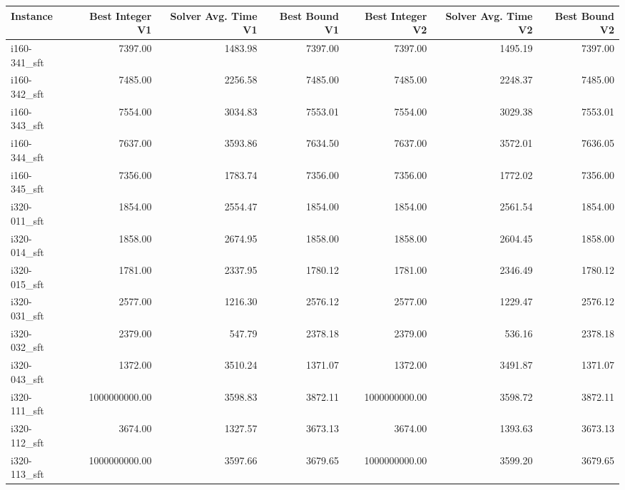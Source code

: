 \begin{tabular}{lrrrrrr}
\toprule
Instance &  Best Integer V1 &  Solver Avg. Time V1 &  Best Bound V1 &  Best Integer V2 &  Solver Avg. Time V2 &  Best Bound V2 \\
\midrule
i160-341\_sft &          7397.00 &              1483.98 &        7397.00 &          7397.00 &              1495.19 &        7397.00 \\
i160-342\_sft &          7485.00 &              2256.58 &        7485.00 &          7485.00 &              2248.37 &        7485.00 \\
i160-343\_sft &          7554.00 &              3034.83 &        7553.01 &          7554.00 &              3029.38 &        7553.01 \\
i160-344\_sft &          7637.00 &              3593.86 &        7634.50 &          7637.00 &              3572.01 &        7636.05 \\
i160-345\_sft &          7356.00 &              1783.74 &        7356.00 &          7356.00 &              1772.02 &        7356.00 \\
i320-011\_sft &          1854.00 &              2554.47 &        1854.00 &          1854.00 &              2561.54 &        1854.00 \\
i320-014\_sft &          1858.00 &              2674.95 &        1858.00 &          1858.00 &              2604.45 &        1858.00 \\
i320-015\_sft &          1781.00 &              2337.95 &        1780.12 &          1781.00 &              2346.49 &        1780.12 \\
i320-031\_sft &          2577.00 &              1216.30 &        2576.12 &          2577.00 &              1229.47 &        2576.12 \\
i320-032\_sft &          2379.00 &               547.79 &        2378.18 &          2379.00 &               536.16 &        2378.18 \\
i320-043\_sft &          1372.00 &              3510.24 &        1371.07 &          1372.00 &              3491.87 &        1371.07 \\
i320-111\_sft &    1000000000.00 &              3598.83 &        3872.11 &    1000000000.00 &              3598.72 &        3872.11 \\
i320-112\_sft &          3674.00 &              1327.57 &        3673.13 &          3674.00 &              1393.63 &        3673.13 \\
i320-113\_sft &    1000000000.00 &              3597.66 &        3679.65 &    1000000000.00 &              3599.20 &        3679.65 \\

\end{tabular}
